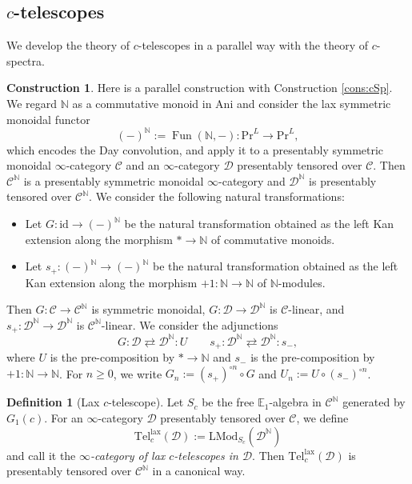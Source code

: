 \documentclass{amsart}
\theoremstyle{plain}
\theoremstyle{definition}
\newtheorem{definition}[theorem]{Definition}
\newtheorem{construction}[theorem]{Construction}
\theoremstyle{remark}
\numberwithin{equation}{theorem}
\newcommand{\mcal}[1]{\mathcal{#1}}
\newcommand{\mbb}[1]{\mathbb{#1}}
\newcommand{\Ani}{\mathrm{Ani}}
\newcommand{\LMod}{\mathrm{LMod}}
\renewcommand{\Pr}{\mathrm{Pr}}
\newcommand{\Tel}{\mathrm{Tel}}
\newcommand{\id}{\mathrm{id}}
\newcommand{\lax}{\mathrm{lax}}
\newcommand{\Fun}{\operatorname{Fun}}
\begin{document}
\subsection{$c$-telescopes}\label{cTe}

We develop the theory of $c$-telescopes in a parallel way with the theory of $c$-spectra.

\begin{construction}\label{cons:cTe}
Here is a parallel construction with Construction \ref{cons:cSp}.
We regard $\mbb{N}$ as a commutative monoid in $\Ani$ and consider the lax symmetric monoidal functor
\[
	(-)^\mbb{N} := \Fun(\mbb{N},-) \colon \Pr^L \to \Pr^L,
\]
which encodes the Day convolution, and apply it to a presentably symmetric monoidal $\infty$-category $\mcal{C}$ and an $\infty$-category $\mcal{D}$ presentably tensored over $\mcal{C}$.
Then $\mcal{C}^\mbb{N}$ is a presentably symmetric monoidal $\infty$-category and $\mcal{D}^\mbb{N}$ is presentably tensored over $\mcal{C}^\mbb{N}$.
We consider the following natural transformations:
\begin{itemize}[label={---},leftmargin=*]
\item Let $G\colon\id\to(-)^\mbb{N}$ be the natural transformation obtained as the left Kan extension along the morphism $*\to\mbb{N}$ of commutative monoids.
\item Let $s_+\colon(-)^\mbb{N}\to(-)^\mbb{N}$ be the natural transformation obtained as the left Kan extension along the morphism $+1\colon\mbb{N}\to\mbb{N}$ of $\mbb{N}$-modules.
\end{itemize}
Then $G\colon\mcal{C}\to\mcal{C}^\mbb{N}$ is symmetric monoidal, $G\colon\mcal{D}\to\mcal{D}^\mbb{N}$ is $\mcal{C}$-linear, and $s_+\colon\mcal{D}^\mbb{N}\to\mcal{D}^\mbb{N}$ is $\mcal{C}^\mbb{N}$-linear.
We consider the adjunctions
\[
	G\colon\mcal{D}\rightleftarrows\mcal{D}^\mbb{N}\colon U \qquad
	s_+\colon\mcal{D}^\mbb{N}\rightleftarrows\mcal{D}^\mbb{N}\colon s_-,
\]
where $U$ is the pre-composition by $*\to\mbb{N}$ and $s_-$ is the pre-composition by $+1\colon\mbb{N}\to\mbb{N}$.
For $n\ge 0$, we write $G_n:=(s_+)^{\circ n}\circ G$ and $U_n:=U\circ(s_-)^{\circ n}$.
\end{construction}

\begin{definition}[Lax $c$-telescope]\label{def:cTe}
Let $S_c$ be the free $\mbb{E}_1$-algebra in $\mcal{C}^\mbb{N}$ generated by $G_1(c)$.
For an $\infty$-category $\mcal{D}$ presentably tensored over $\mcal{C}$, we define
\[
	\Tel_c^\lax(\mcal{D}) := \LMod_{S_c}(\mcal{D}^\mbb{N})
\]
and call it the \textit{$\infty$-category of lax $c$-telescopes in $\mcal{D}$}.
Then $\Tel_c^\lax(\mcal{D})$ is presentably tensored over $\mcal{C}^\mbb{N}$ in a canonical way.
\end{definition}
\end{document}
